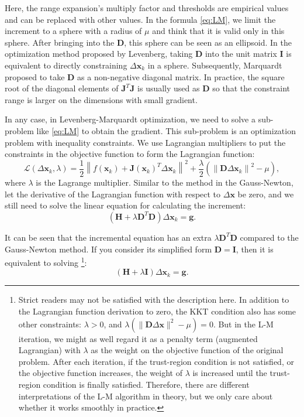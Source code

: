 Here, the range expansion's multiply factor and thresholds are empirical values and can be replaced with other values. In the formula \eqref{eq:LM}, we limit the increment to a sphere with a radius of $\mu$ and think that it is valid only in this sphere. After bringing into the $\mathbf{D}$, this sphere can be seen as an ellipsoid. In the optimization method proposed by Levenberg, taking $\mathbf{D}$ into the unit matrix $\mathbf{I}$ is equivalent to directly constraining $\Delta \mathbf{x}_k$ in a sphere. Subsequently, Marquardt proposed to take $\mathbf{D}$ as a non-negative diagonal matrix. In practice, the square root of the diagonal elements of $\mathbf{J}^T \mathbf{J}$ is usually used as $\mathbf{D}$ so that the constraint range is larger on the dimensions with small gradient.

In any case, in Levenberg-Marquardt optimization, we need to solve a sub-problem like \eqref{eq:LM} to obtain the gradient. This sub-problem is an optimization problem with inequality constraints. We use Lagrangian multipliers to put the constraints in the objective function to form the Lagrangian function:
\begin{equation}
    \mathcal{L}(\Delta \mathbf{x}_k, \lambda)= \frac{1}{2} {\left\| {f\left( \mathbf{x}_k \right) + \mathbf{J} \left( \mathbf{x}_k \right)^T \Delta \mathbf{x}_k} \right\|^2} + \frac{\lambda}{2} \left( \left\| \mathbf{D} \Delta \mathbf{x}_k \right\|^2 - \mu \right),
\end{equation}
where $\lambda$ is the Lagrange multiplier. Similar to the method in the Gauss-Newton, let the derivative of the Lagrangian function with respect to $\Delta \mathbf{x}$ be zero, and we still need to solve the linear equation for calculating the increment:
\begin{equation}
    \left( \mathbf{H} +\lambda \mathbf{D}^T \mathbf{D} \right) \Delta \mathbf{x}_k = \mathbf{g}.
\end{equation}

It can be seen that the incremental equation has an extra $\lambda \mathbf{D}^T \mathbf{D}$ compared to the Gauss-Newton method. If you consider its simplified form $\mathbf{D}=\mathbf{I}$, then it is equivalent to solving \footnote{Strict readers may not be satisfied with the description here. In addition to the Lagrangian function derivation to zero, the KKT condition also has some other constraints: $\lambda>0$, and $\lambda(\|\mathbf{D} \Delta \mathbf{x}\|^2-\mu)=0$. But in the L-M iteration, we might as well regard it as a penalty term (augmented Lagrangian) with $\lambda$ as the weight on the objective function of the original problem. After each iteration, if the trust-region condition is not satisfied, or the objective function increases, the weight of $\lambda$ is increased until the trust-region condition is finally satisfied. Therefore, there are different interpretations of the L-M algorithm in theory, but we only care about whether it works smoothly in practice. }:
\begin{displaymath}
    \left( \mathbf{H} +\lambda \mathbf{I} \right) \Delta \mathbf{x}_k = \mathbf{g}.
\end{displaymath}

